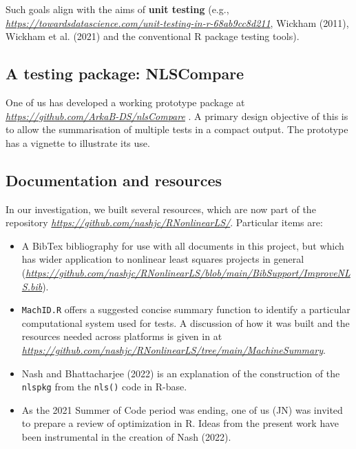 Such goals align with the aims of \textbf{unit testing}
(e.g., \emph{\url{https://towardsdatascience.com/unit-testing-in-r-68ab9cc8d211}}, Wickham (2011), Wickham et al. (2021)
and the conventional R package testing tools).

\hypertarget{a-testing-package-nlscompare}{%
\subsection{A testing package: NLSCompare}\label{a-testing-package-nlscompare}}

One of us has developed a working prototype package at
\emph{\url{https://github.com/ArkaB-DS/nlsCompare}} .
A primary design objective of this is to allow the summarisation of multiple tests in
a compact output. The prototype has a vignette to illustrate its use.

\hypertarget{documentation-and-resources}{%
\subsection{Documentation and resources}\label{documentation-and-resources}}

In our investigation, we built several resources, which are now part of
the repository \emph{\url{https://github.com/nashjc/RNonlinearLS/}}. Particular items
are:

\begin{itemize}
\item
  A BibTex bibliography for use with all documents in this project, but which
  has wider application to nonlinear least squares projects in general
  (\emph{\url{https://github.com/nashjc/RNonlinearLS/blob/main/BibSupport/ImproveNLS.bib}}).
\item
  \texttt{MachID.R} offers a suggested concise summary function
  to identify a particular computational system used for tests. A discussion
  of how it was built and the resources needed across platforms is given in
  at \emph{\url{https://github.com/nashjc/RNonlinearLS/tree/main/MachineSummary}}.
\item
  Nash and Bhattacharjee (2022) is an explanation of the construction of the \texttt{nlspkg} from the
  \texttt{nls()} code in R-base.
\item
  As the 2021 Summer of Code period was ending, one of us (JN) was invited to prepare
  a review of optimization in R. Ideas from the present work have been instrumental
  in the creation of Nash (2022).
\end{itemize}

